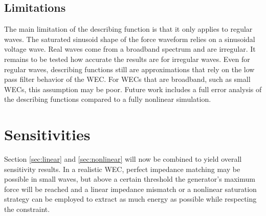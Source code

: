 \documentclass{ifacconf}
\begin{document}


\subsection{Limitations}
The main limitation of the describing function is that it only applies to regular waves. The saturated sinusoid shape of the force waveform relies on a sinusoidal voltage wave. Real waves come from a broadband spectrum and are irregular. It remains to be tested how accurate the results are for irregular waves. Even for regular waves, describing functions still are approximations that rely on the low pass filter behavior of the WEC. For WECs that are broadband, such as small WECs, this assumption may be poor. Future work includes a full error analysis of the describing functions compared to a fully nonlinear simulation.

\section{Sensitivities}\label{sec:sensitivities}
Section \ref{sec:linear} and \ref{sec:nonlinear} will now be combined to yield overall sensitivity results. In a realistic WEC, perfect impedance matching may be possible in small waves, but above a certain threshold the generator's maximum force will be reached and a linear impedance mismatch or a nonlinear saturation strategy can be employed to extract as much energy as possible while respecting the constraint.
\end{document}
